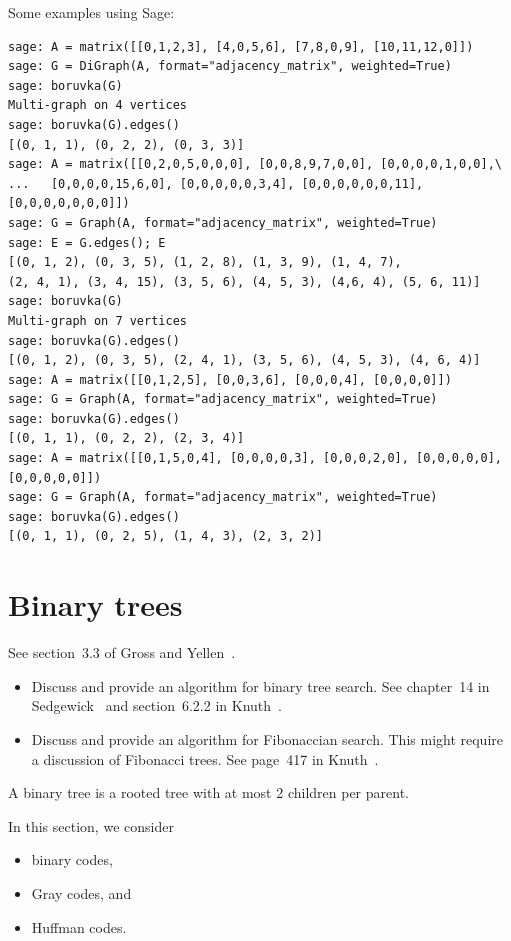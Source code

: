 Some examples using Sage:
%
\begin{lstlisting}
sage: A = matrix([[0,1,2,3], [4,0,5,6], [7,8,0,9], [10,11,12,0]])
sage: G = DiGraph(A, format="adjacency_matrix", weighted=True)
sage: boruvka(G)
Multi-graph on 4 vertices
sage: boruvka(G).edges()
[(0, 1, 1), (0, 2, 2), (0, 3, 3)]
sage: A = matrix([[0,2,0,5,0,0,0], [0,0,8,9,7,0,0], [0,0,0,0,1,0,0],\
...   [0,0,0,0,15,6,0], [0,0,0,0,0,3,4], [0,0,0,0,0,0,11], [0,0,0,0,0,0,0]])
sage: G = Graph(A, format="adjacency_matrix", weighted=True)
sage: E = G.edges(); E
[(0, 1, 2), (0, 3, 5), (1, 2, 8), (1, 3, 9), (1, 4, 7),
(2, 4, 1), (3, 4, 15), (3, 5, 6), (4, 5, 3), (4,6, 4), (5, 6, 11)]
sage: boruvka(G)
Multi-graph on 7 vertices
sage: boruvka(G).edges()
[(0, 1, 2), (0, 3, 5), (2, 4, 1), (3, 5, 6), (4, 5, 3), (4, 6, 4)]
sage: A = matrix([[0,1,2,5], [0,0,3,6], [0,0,0,4], [0,0,0,0]])
sage: G = Graph(A, format="adjacency_matrix", weighted=True)
sage: boruvka(G).edges()
[(0, 1, 1), (0, 2, 2), (2, 3, 4)]
sage: A = matrix([[0,1,5,0,4], [0,0,0,0,3], [0,0,0,2,0], [0,0,0,0,0], [0,0,0,0,0]])
sage: G = Graph(A, format="adjacency_matrix", weighted=True)
sage: boruvka(G).edges()
[(0, 1, 1), (0, 2, 5), (1, 4, 3), (2, 3, 2)]
\end{lstlisting}



\section{Binary trees}

See section~3.3 of Gross and Yellen~\cite{GrossYellen1999}.

{\color{red}
\begin{itemize}
\item Discuss and provide an algorithm for binary tree search. See
  chapter~14 in Sedgewick~\cite{Sedgewick1990} and section~6.2.2 in
  Knuth~\cite{Knuth1998c}.

\item Discuss and provide an algorithm for Fibonaccian search. This
  might require a discussion of Fibonacci trees. See page~417 in
  Knuth~\cite{Knuth1998c}.
\end{itemize}
}

A binary tree is a rooted tree with at most 2 children per parent.

In this section, we consider

\begin{itemize}
\item binary codes,

\item Gray codes, and

\item Huffman codes.
\end{itemize}

